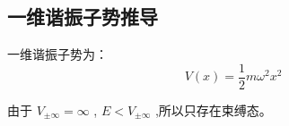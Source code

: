 \documentclass[12pt, a4paper, oneside, UTF8]{ctexbook}
\begin{document}
\subsection{一维谐振子势推导 \label{chap:1DHarmonicOscillator}}
一维谐振子势为：
\begin{equation}
    V(x)=\frac{1}{2}m\omega^2x^2
\end{equation}

由于 $ V_{\pm\infty} = \infty $ , $ E<V_{\pm\infty}$ ,所以只存在束缚态。




\ifx\allfiles\undefined
\end{document}
